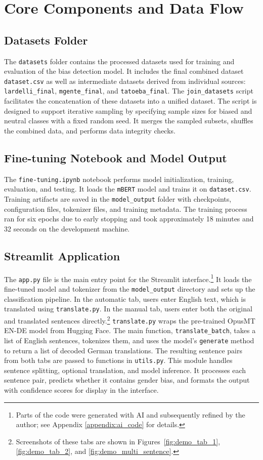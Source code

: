 \section{Core Components and Data Flow}
    \subsection{Datasets Folder}
        The \texttt{datasets} folder contains the processed datasets used for training and evaluation of the bias detection model. It includes the final combined dataset \texttt{dataset.csv} as well as intermediate datasets derived from individual sources: \texttt{lardelli\_final}, \texttt{mgente\_final}, and \texttt{tatoeba\_final}. The \texttt{join\_datasets} script facilitates the concatenation of these datasets into a unified dataset. The script is designed to support iterative sampling by specifying sample sizes for biased and neutral classes with a fixed random seed. It merges the sampled subsets, shuffles the combined data, and performs data integrity checks. 

    \subsection{Fine-tuning Notebook and Model Output}
        The \texttt{fine-tuning.ipynb} notebook performs model initialization, training, evaluation, and testing. It loads the \texttt{mBERT} model and trains it on \texttt{dataset.csv}. Training artifacts are saved in the \texttt{model\_output} folder with checkpoints, configuration files, tokenizer files, and training metadata. The training process ran for six epochs due to early stopping and took approximately 18 minutes and 32 seconds on the development machine. 

    \subsection{Streamlit Application}
        The \texttt{app.py} file is the main entry point for the Streamlit interface.\footnote{Parts of the code were generated with AI and subsequently refined by the author; see Appendix \ref{appendix:ai_code} for details.}
        It loads the fine-tuned model and tokenizer from the \texttt{model\_output} directory and sets up the classification pipeline. In the automatic tab, users enter English text, which is translated using \texttt{translate.py}. In the manual tab, users enter both the original and translated sentences directly.\footnote{Screenshots of these tabs are shown in Figures~\ref{fig:demo_tab_1}, \ref{fig:demo_tab_2}, and \ref{fig:demo_multi_sentence}.} \texttt{translate.py} wraps the pre-trained OpusMT EN-DE model from Hugging Face. The main function, \texttt{translate\_batch}, takes a list of English sentences, tokenizes them, and uses the model's \texttt{generate} method to return a list of decoded German translations. The resulting sentence pairs from both tabs are passed to functions in \texttt{utils.py}. This module handles sentence splitting, optional translation, and model inference. It processes each sentence pair, predicts whether it contains gender bias, and formats the output with confidence scores for display in the interface.


